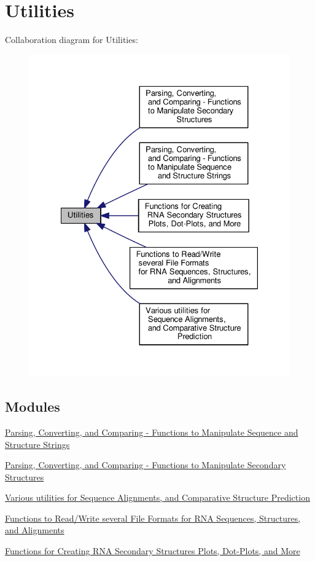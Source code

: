 \hypertarget{group__utils}{\section{Utilities}
\label{group__utils}
}
Collaboration diagram for Utilities\-:
\nopagebreak
\begin{figure}[H]
\begin{center}
\leavevmode
\includegraphics[width=328pt]{group__utils}
\end{center}
\end{figure}
\subsection*{Modules}
\begin{DoxyCompactItemize}
\item 
\hyperlink{group__string__utils}{Parsing, Converting, and Comparing -\/ Functions to Manipulate Sequence and Structure Strings}
\item 
\hyperlink{group__struct__utils}{Parsing, Converting, and Comparing -\/ Functions to Manipulate Secondary Structures}
\item 
\hyperlink{group__aln__utils}{Various utilities for Sequence Alignments, and Comparative Structure Prediction}
\item 
\hyperlink{group__file__utils}{Functions to Read/\-Write several File Formats for R\-N\-A Sequences, Structures, and Alignments}
\item 
\hyperlink{group__plotting__utils}{Functions for Creating R\-N\-A Secondary Structures Plots, Dot-\/\-Plots, and More}
\end{DoxyCompactItemize}
